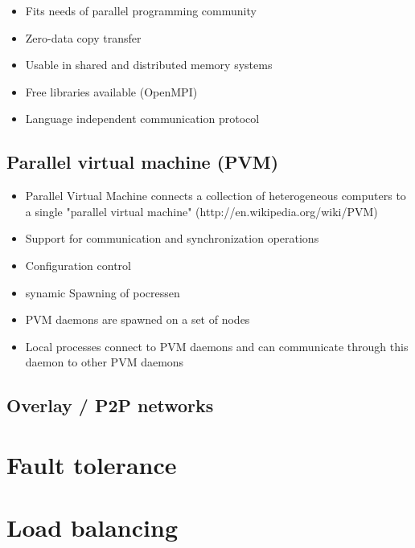 \begin{itemize}
\item Fits needs of parallel programming community
\item Zero-data copy transfer
\item Usable in shared and distributed memory systems
\item Free libraries available (OpenMPI)
\item Language independent communication protocol
\end{itemize}

\subsection{Parallel virtual machine (PVM)}
\label{sec:pvm}
\begin{itemize}
\item Parallel Virtual Machine connects a collection of heterogeneous computers
  to a single "parallel virtual machine"
  (http://en.wikipedia.org/wiki/PVM)
\item Support for communication and synchronization operations
\item Configuration control
\item synamic Spawning of pocressen
\item PVM daemons are spawned on a set of nodes
\item Local processes connect to PVM daemons and can 
  communicate through this daemon to other PVM daemons
\end{itemize}

\subsection{Overlay / P2P networks}
\section{Fault tolerance}
\section{Load balancing}

